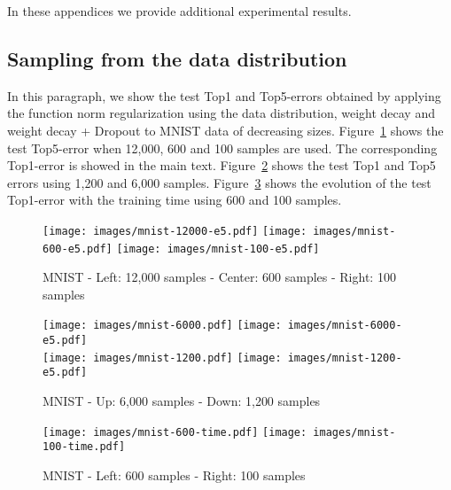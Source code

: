 \documentclass{article}
\begin{document}
In these appendices we provide additional experimental results.

\subsection{Sampling from the data distribution}
In this paragraph, we show the test Top1 and Top5-errors obtained by applying the function norm regularization using the data distribution, weight decay and weight decay + Dropout to MNIST data of decreasing sizes. Figure~\ref{sup-reg-im-MNIST-e5} shows the test Top5-error when 12,000, 600 and 100 samples are used. The corresponding Top1-error is showed in the main text. Figure~\ref{sup-reg-im-MNIST} shows the test Top1 and Top5 errors using 1,200 and 6,000 samples. Figure~\ref{t-vs-err-im-MNIST} shows the evolution of the test Top1-error with the training time using 600 and 100 samples.


\begin{figure}[ht!]
\texttt{[image: images/mnist-12000-e5.pdf]} \hfill 
\texttt{[image: images/mnist-600-e5.pdf]} \hfill
\texttt{[image: images/mnist-100-e5.pdf]}
\caption{MNIST - Left: 12,000 samples - Center: 600 samples - Right: 100 samples}
\label{sup-reg-im-MNIST-e5}
\end{figure}


\begin{figure}[ht!]
\texttt{[image: images/mnist-6000.pdf]} \hfill 
\texttt{[image: images/mnist-6000-e5.pdf]} \\
\texttt{[image: images/mnist-1200.pdf]} \hfill
\texttt{[image: images/mnist-1200-e5.pdf]}
\caption{MNIST - Up: 6,000 samples - Down: 1,200 samples}
\label{sup-reg-im-MNIST}
\end{figure}

\begin{figure}[ht!]
\texttt{[image: images/mnist-600-time.pdf]} \hfill
\texttt{[image: images/mnist-100-time.pdf]}
\caption{MNIST - Left: 600 samples - Right: 100 samples}
\label{t-vs-err-im-MNIST}
\end{figure}
\end{document}
